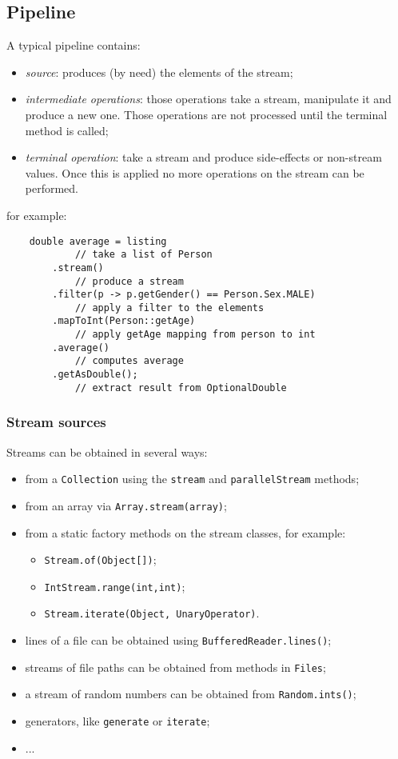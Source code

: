 \subsection{Pipeline}
A typical pipeline contains:
\begin{itemize}
    \item \emph{source}: produces (by need) the elements of the stream;
    
    \item \emph{intermediate operations}: those operations take a stream, manipulate it and produce a new one.
    Those operations are not processed until the terminal method is called;

    \item \emph{terminal operation}: take a stream and produce side-effects or non-stream values.
    Once this is applied no more operations on the stream can be performed.
\end{itemize}
for example:
\begin{verbatim}
    double average = listing        
            // take a list of Person
        .stream()
            // produce a stream
        .filter(p -> p.getGender() == Person.Sex.MALE)
            // apply a filter to the elements
        .mapToInt(Person::getAge)
            // apply getAge mapping from person to int
        .average()
            // computes average
        .getAsDouble();
            // extract result from OptionalDouble
\end{verbatim}

\subsubsection{Stream sources}
Streams can be obtained in several ways:
\begin{itemize}
    \item from a \verb|Collection| using the \verb|stream| and \verb|parallelStream| methods;
    \item from an array via \verb|Array.stream(array)|;
    \item from a static factory methods on the stream classes, for example:
    \begin{itemize}
        \item \verb|Stream.of(Object[])|;
        \item \verb|IntStream.range(int,int)|;
        \item \verb|Stream.iterate(Object, UnaryOperator)|.
    \end{itemize}
    \item lines of a file can be obtained using \verb|BufferedReader.lines()|;
    \item streams of file paths can be obtained from methods in \verb|Files|;
    \item a stream of random numbers can be obtained from \verb|Random.ints()|;
    \item generators, like \verb|generate| or \verb|iterate|;
    \item ...
\end{itemize}

